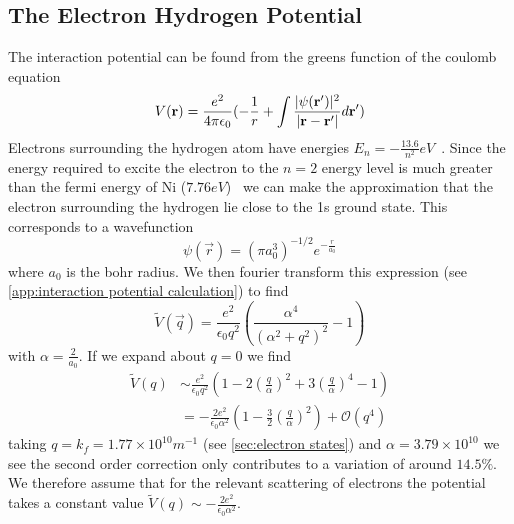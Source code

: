 \subsection{The Electron Hydrogen Potential}\label{sec:electron hydrogen potential}
The interaction potential can be found from
the greens function of the coulomb
equation~\cite{AQP_Problems}
\begin{equation}
    V(\mathbf{r}) = \frac{e^2}{4 \pi \epsilon_0}(
    -\frac{1}{r}
    + \int{\frac{\lvert\psi(\mathbf{r}')\rvert^2}{
            \lvert\mathbf{r} - \mathbf{r'}\rvert} d\mathbf{r}'})
\end{equation}
Electrons surrounding the hydrogen
atom have energies
\(E_n = -\frac{13.6}{n^2} eV\)~\cite{griffiths_schroeter_2018}.
Since the energy required to excite the electron
to the \(n=2\) energy level is much greater
than the fermi energy of Ni
(\(7.76eV\))~\cite{PhysRev.131.2469} we can
make the approximation that the electron surrounding
the hydrogen lie close to the 1s ground state. This
corresponds to a wavefunction\cite{griffiths_schroeter_2018}
\begin{equation}
    \psi(\vec{r}) = {(\pi a_0^3)}^{-1/2} e^{-\frac{r}{a_0}}
\end{equation}
where \(a_0\) is
the bohr radius.
We then fourier
transform this expression
(see \cref{app:interaction potential calculation})
to find
\begin{equation}
    \tilde{V}(\vec{q}) = \frac{e^2}{\epsilon_0 q^2}(
    \frac{\alpha^4}{{(\alpha^2 + q^2)}^2} - 1
    )
\end{equation}
with \(\alpha = \frac{2}{a_0}\). If we expand
about \(q=0\) we find
\begin{align}
    \tilde{V}(q) & \sim \frac{e^2}{\epsilon_0 q^2}(1 - 2{(\frac{q}{\alpha})}^2 + 3 {(\frac{q}{\alpha})}^4 - 1)   \\
    {}           & = -\frac{2e^2}{\epsilon_0 \alpha^2}(1 - \frac{3}{2}{(\frac{q}{\alpha})}^2) + \mathcal{O}(q^4)
\end{align}
taking \(q = k_f = 1.77\times{}10^{10}m^{-1}\)
(see \cref{sec:electron states})
and \(\alpha = 3.79\times{}10^{10}\) we see the second
order correction only contributes to a variation
of around \(14.5\% \).
We therefore assume that for the relevant scattering
of electrons the potential takes a constant
value \(\tilde{V}(q) \sim -\frac{2e^2}{\epsilon_0 \alpha^2}\).


